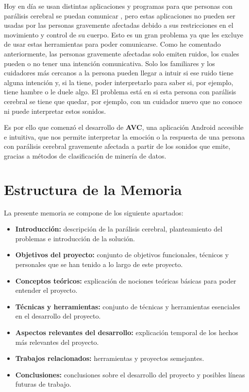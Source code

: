 Hoy en día se usan distintas aplicaciones y programas para que personas con parálisis cerebral se puedan comunicar \cite{jocomunico}, pero estas aplicaciones no pueden ser usadas por las personas gravemente afectadas debido a sus restricciones en el movimiento y control de su cuerpo. Esto es un gran problema ya que les excluye de usar estas herramientas para poder comunicarse. Como he comentado anteriormente, las personas gravemente afectadas solo emiten ruidos, los cuales pueden o no tener una intención comunicativa. Solo los familiares y los cuidadores más cercanos a la persona pueden llegar a intuir si ese ruido tiene alguna intención y, si la tiene, poder interpretarlo para saber si, por ejemplo, tiene hambre o le duele algo. El problema está en si esta persona con parálisis cerebral se tiene que quedar, por ejemplo, con un cuidador nuevo que no conoce ni puede interpretar estos sonidos.

Es por ello que comenzó el desarrollo de \textbf{AVC}, una aplicación Android accesible e intuitiva, que nos permite interpretar la emoción o la respuesta de una persona con parálisis cerebral gravemente afectada a partir de los sonidos que emite, gracias a métodos de clasificación de minería de datos.

\section{Estructura de la Memoria}
La presente memoria se compone de los siguiente apartados: 
\begin{itemize}
	\item 
		\textbf{Introducción:} descripción de la parálisis cerebral, planteamiento del problemas e introducción de la solución.
	\item
		\textbf{Objetivos del proyecto:} conjunto de objetivos funcionales, técnicos y personales que se han tenido a lo largo de este proyecto.
	\item
		\textbf{Conceptos teóricos:} explicación de nociones teóricas básicas para poder entender el proyecto.
	\item
		\textbf{Técnicas y herramientas:} conjunto de técnicas y herramientas esenciales en el desarrollo del proyecto.
	\item
		\textbf{Aspectos relevantes del desarrollo:} explicación temporal de los hechos más relevantes del proyecto.
	\item
		\textbf{Trabajos relacionados:} herramientas y proyectos semejantes.
	\item
		\textbf{Conclusiones:} conclusiones sobre el desarrollo del proyecto y posibles líneas futuras de trabajo.
\end{itemize}

